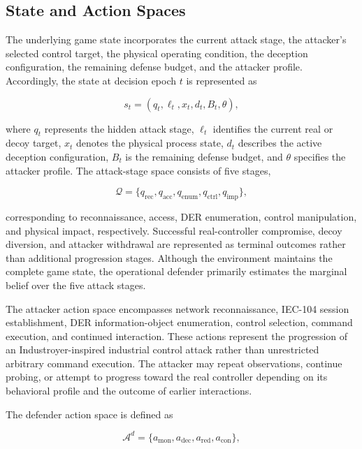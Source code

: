 \documentclass[10pt,conference]{IEEEtran}
\begin{document}
\subsection{State and Action Spaces}

The underlying game state incorporates the current attack stage, the attacker's selected control target, the physical operating condition, the deception configuration, the remaining defense budget, and the attacker profile. Accordingly, the state at decision epoch $t$ is represented as

\begin{equation}
s_t = (q_t,\ell_t,x_t,d_t,B_t,\theta),
\label{eq:state_definition}
\end{equation}

\noindent
where $q_t$ represents the hidden attack stage, $\ell_t$ identifies the current real or decoy target, $x_t$ denotes the physical process state, $d_t$ describes the active deception configuration, $B_t$ is the remaining defense budget, and $\theta$ specifies the attacker profile. The attack-stage space consists of five stages,

\begin{equation}
\mathcal{Q} =
\{q_{\mathrm{rec}},q_{\mathrm{acc}},
q_{\mathrm{enum}},q_{\mathrm{ctrl}},
q_{\mathrm{imp}}\},
\label{eq:attack_stages}
\end{equation}

\noindent
corresponding to reconnaissance, access, DER enumeration, control manipulation, and physical impact, respectively. Successful real-controller compromise, decoy diversion, and attacker withdrawal are represented as terminal outcomes rather than additional progression stages. Although the environment maintains the complete game state, the operational defender primarily estimates the marginal belief over the five attack stages.

The attacker action space encompasses network reconnaissance, IEC-104 session establishment, DER information-object enumeration, control selection, command execution, and continued interaction. These actions represent the progression of an Industroyer-inspired industrial control attack rather than unrestricted arbitrary command execution. The attacker may repeat observations, continue probing, or attempt to progress toward the real controller depending on its behavioral profile and the outcome of earlier interactions.

The defender action space is defined as

\begin{equation}
\mathcal{A}^{d} =
\{a_{\mathrm{mon}},a_{\mathrm{dec}},
a_{\mathrm{red}},a_{\mathrm{con}}\},
\label{eq:defender_actions}
\end{equation}
\end{document}
